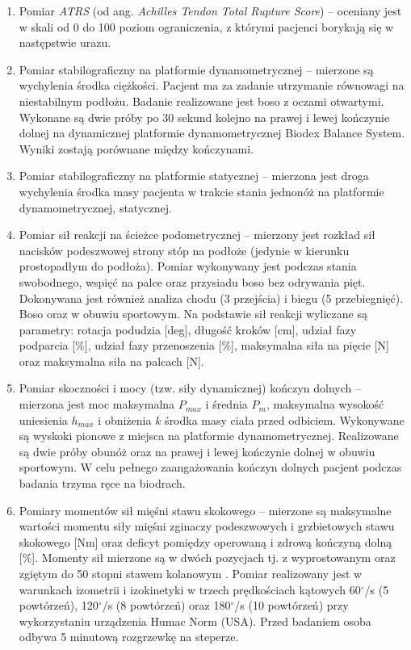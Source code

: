 \begin{enumerate}
	\item Pomiar \textit{ATRS} (od ang. \textit{Achilles Tendon Total Rupture Score}) -- oceniany jest w skali od 0 do 100 \cite{NilssonHelander2007} poziom ograniczenia, z którymi pacjenci borykają się w następstwie urazu.
	\item Pomiar stabilograficzny na platformie dynamometrycznej -- mierzone są wychylenia środka ciężkości. Pacjent ma za zadanie utrzymanie równowagi na niestabilnym podłożu. Badanie realizowane jest boso z oczami otwartymi. Wykonane są dwie próby po 30 sekund kolejno na prawej i lewej kończynie dolnej na dynamicznej platformie dynamometrycznej Biodex Balance System. Wyniki zostają porównane między kończynami. 
	\item Pomiar stabilograficzny na platformie statycznej -- mierzona jest droga wychylenia środka masy pacjenta w trakcie stania jednonóż na platformie dynamometrycznej, statycznej.
	\item Pomiar sił reakcji na ścieżce podometrycznej -- mierzony jest rozkład sił nacisków podeszwowej strony stóp na podłoże (jedynie w kierunku prostopadłym do podłoża). Pomiar wykonywany jest podczas stania swobodnego, wspięć na palce oraz przysiadu boso bez odrywania pięt. Dokonywana jest również analiza chodu (3 przejścia) i biegu (5 przebiegnięć). Boso oraz w obuwiu sportowym. Na podstawie sił reakcji wyliczane są parametry: rotacja podudzia [deg], długość kroków [cm], udział fazy podparcia [\%], udział fazy przenoszenia [\%], maksymalna siła na pięcie [N] oraz maksymalna siła na palcach [N].
	\item Pomiar skoczności i mocy (tzw. siły dynamicznej) kończyn dolnych -- mierzona jest moc maksymalna $P_{max}$ i średnia $P_m$, maksymalna wysokość uniesienia $h_{max}$ i obniżenia $k$ środka masy ciała przed odbiciem. Wykonywane są wyskoki pionowe z miejsca na platformie dynamometrycznej. Realizowane są dwie próby obunóż oraz na prawej i lewej kończynie dolnej w obuwiu sportowym. W celu pełnego zaangażowania kończyn dolnych pacjent podczas badania trzyma ręce na biodrach. 
	\item Pomiary momentów sił mięśni stawu skokowego -- mierzone są maksymalne wartości momentu siły mięśni zginaczy podeszwowych i grzbietowych stawu skokowego [Nm] oraz deficyt pomiędzy operowaną i zdrową kończyną dolną [\%]. Momenty sił mierzone są w dwóch pozycjach tj. z wyprostowanym oraz zgiętym do 50 stopni stawem kolanowym \cite{Orishimo2008}. Pomiar realizowany jest w warunkach izometrii i izokinetyki w trzech prędkościach kątowych 60$^\circ$/s (5 powtórzeń), 120$^\circ$/s (8 powtórzeń) oraz 180$^\circ$/s (10 powtórzeń) przy wykorzystaniu urządzenia Humac Norm (USA). Przed badaniem osoba odbywa 5 minutową rozgrzewkę na steperze.
\end{enumerate}

